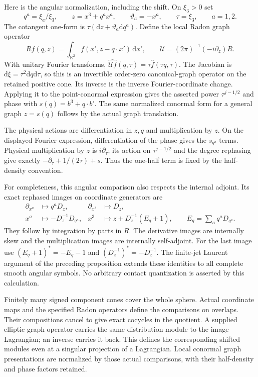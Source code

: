 \documentclass[
  english,
  11pt,
  reqno]{amsart}
\begin{document}
Here is the angular normalization, including the shift. On \(\xi_3>0\)
set%
 \[
q^a=\xi_a/\xi_3,\qquad
z=x^3+q^ax^a,\qquad
\vartheta_a=-x^a,\qquad
\tau=\xi_3,
\qquad a=1,2.
\] The cotangent one-form is
\(\tau(\mathrm dz+\vartheta_a\mathrm dq^a)\). Define the local Radon
graph operator%
 \[
Rf(q,z)=\int_{\mathbb R^2}f(x',z-q\cdot x')\,\mathrm dx',
\qquad
\mathcal U=(2\pi)^{-1}(-i\partial_z)R.
\] With unitary Fourier transforms,
\(\widehat{\mathcal U f}(q,\tau)=\tau\widehat f(\tau q,\tau)\). The
Jacobian is \(\mathrm d\xi=\tau^2\mathrm dq\mathrm d\tau\), so this is
an invertible order-zero canonical-graph operator on the retained
positive cone. Its inverse is the inverse Fourier-coordinate change.
Applying it to the point-conormal expression gives the asserted power
\(\tau^{j-1/2}\) and phase with \(s(q)=b^3+q\cdot b'\). The same
normalized conormal form for a general graph \(z=s(q)\) follows by the
actual graph translation.

The physical actions are differentiation in \(z,q\) and multiplication
by \(z\). On the displayed Fourier expression, differentiation of the
phase gives the \(s_{q^a}\) terms. Physical multiplication by \(z\) is
\(i\partial_\tau\); its action on \(\tau^{j-1/2}\) and the degree
rephasing give exactly \(-\partial_\tau+1/(2\tau)+s\). Thus the one-half
term is fixed by the half-density convention.

For completeness, this angular comparison also respects the internal
adjoint. Its exact rephased images on coordinate generators are%
 \[
\begin{aligned}
\partial_{x^a}&\longmapsto q^aD_z,&
\partial_{x^3}&\longmapsto D_z,\\
x^a&\longmapsto-D_z^{-1}D_{q^a},&
x^3&\longmapsto z+D_z^{-1}(E_q+1),
\qquad E_q=\sum_aq^aD_{q^a}.
\end{aligned}
\] They follow by integration by parts in \(R\). The derivative images
are internally skew and the multiplication images are internally
self-adjoint. For the last image use \((E_q+1)^*=-E_q-1\) and
\((D_z^{-1})^*=-D_z^{-1}\). The finite-jet Laurent argument of the
preceding proposition extends these identities to all complete smooth
angular symbols. No arbitrary contact quantization is asserted by this
calculation.

Finitely many signed component cones cover the whole sphere. Actual
coordinate maps and the specified Radon operators define the comparisons
on overlaps. Their compositions cancel to give exact cocycles in the
quotient. A supplied elliptic graph operator carries the same
distribution module to the image Lagrangian; an inverse carries it back.
This defines the corresponding shifted modules even at a singular
projection of a Lagrangian. Local conormal graph presentations are
normalized by those actual comparisons, with their half-density and
phase factors retained.
\end{document}

